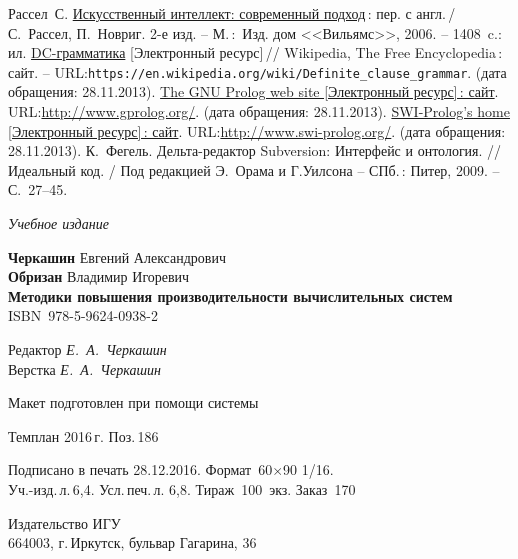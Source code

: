 \documentclass[14pt, a4paper, openany, twoside, draft]{extbook} %
\def\emphbib#1{#1}
\begin{document}
\begin{thebibliography}{99}
 Рассел~С. \href{http://www.aiportal.ru/downloads/books/ai-modern-approach-2-edition-by-rassel-norvig.html}{Искусственный интеллект: современный подход}\,{}: пер. с англ.\,{}/ С.~Рассел, П.~Новриг. 2-е изд. -- М.\,:~Изд. дом <<Вильямс>>, 2006. -- 1408~c.: ил.
 \emphbib{\href{https://en.wikipedia.org/wiki/Definite_clause_grammar}{DC-грамматика}} [Электронный ресурс]\,{}// Wikipedia, The Free Encyclopedia\,{}: сайт. -- URL:\texttt{https://en.wikipedia.org/wiki/Definite\_clause\linebreak\_grammar}. (дата обращения: 28.11.2013).
 \emphbib{\href{http://www.gprolog.org/}{The GNU Prolog web site [Электронный ресурс]\,{}: сайт}}. URL:\url{http://www.gprolog.org/}. (дата обращения: 28.11.2013).
 \emphbib{\href{http://www.swi-prolog.org/}{SWI-Prolog's
      home [Электронный ресурс]\,{}:
      сайт}}. URL:\url{http://www.swi-prolog.org/}. (дата обращения:
  28.11.2013).
 К.~Фегель. Дельта-редактор Subversion: Интерфейс и
  онтология. // Идеальный код. / Под редакцией Э.~Орама и Г.Уилсона --
  СПб.\,: Питер, 2009. -- С.~27--45.
\end{thebibliography}
\label{lastpage}
\newpage
\thispagestyle{empty}
\mbox{}

\vfill\vfill\vfill\vfill

\hfill{}{\small\itshape Учебное издание}
\vspace{4ex}
\begin{center}
{\small\textbf{Черкашин} Евгений Александрович\\}
{\small\textbf{Обризан} Владимир Игоревич \\[1em]}
{\bfseries Методики повышения производительности вычислительных систем}\\[1em]
ISBN~978-5-9624-0938-2
\vfill

\small
Редактор \textit{Е.~А.~Черкашин}\\
Верстка \textit{Е.~А.~Черкашин}

\vfill{}
{\small Макет подготовлен при помощи системы \LuaLaTeX\\\mbox{}}
\vfill{}

Темплан 2016\,{}г. Поз.\,{}186

\end{center}
\begin{center}\small
\noindent Подписано в печать 28.12.2016.
Формат~60$\times$90 1/16.\\  %
Уч.-изд.\,{}л.\,{}6,4. Усл.\,{}печ.\,{}л. 6,8. Тираж~100~экз. Заказ~170
\end{center}
\vspace{1           ex}
\begin{center}\small
Издательство ИГУ\\{}
664003, г.\,{}Иркутск, бульвар Гагарина, 36
\end{center}
\end{document}
